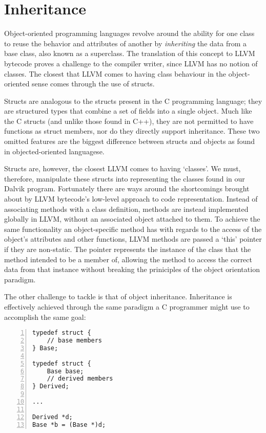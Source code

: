 \section{Inheritance}

Object-oriented programming languages revolve around the ability for one class to reuse the behavior and attributes of another by \textit{inheriting} the data from a base class, also known as a superclass. The translation of this concept to LLVM bytecode proves a challenge to the compiler writer, since LLVM has no notion of classes. The closest that LLVM comes to having class behaviour  in the object-oriented sense comes through the use of structs.

Structs are analogous to the structs present in the C programming language; they are structured types that combine a set of fields into a single object. Much like the C structs (and unlike those found in C++), they are not permitted to have functions as struct members, nor do they directly support inheritance. These two omitted features are the biggest difference between structs and objects as found in objected-oriented languagese.

Structs are, however, the closest LLVM comes to having `classes'. We must, therefore, manipulate these structs into representing the classes found in our Dalvik program. Fortunately there are ways around the shortcomings brought about by LLVM bytecode's low-level approach to code representation. Instead of associating methods with a class definition, methods are instead implemented globally in LLVM, without an associated object attached to them. To achieve the same functionality an object-specific method has with regards to the access of the object's attributes and other functions, LLVM methods are passed a `this' pointer if they are non-static. The pointer represents the instance of the class that the method intended to be a member of, allowing the method to access the correct data from that instance without breaking the priniciples of the object orientation paradigm.

The other challenge to tackle is that of object inheritance. Inheritance is effectively achieved through the same paradigm a C programmer might use to accomplish the same goal:

\lstset{
	language=C,
	basicstyle=\small,
	stringstyle=\ttfamily
}

\begin{lstlisting}[frame=single, numbers=left, numberstyle=\tiny, title=C code]
typedef struct {
    // base members
} Base;

typedef struct {
    Base base;  
    // derived members   
} Derived;

...

Derived *d;
Base *b = (Base *)d;
\end{lstlisting}

